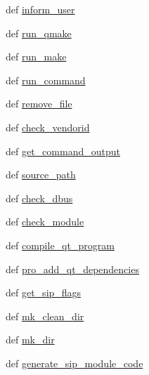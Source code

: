 \begin{DoxyCompactItemize}
def \hyperlink{namespacePyQt-x11-gpl-4_811_82_1_1configure-ng_aa0127c7e4d1567fa51c28bccf7345cb7}{inform\+\_\+user}
\item 
def \hyperlink{namespacePyQt-x11-gpl-4_811_82_1_1configure-ng_a5f1cb3fd0035af51cb0748b88d561f72}{run\+\_\+qmake}
\item 
def \hyperlink{namespacePyQt-x11-gpl-4_811_82_1_1configure-ng_a96462e6df602133502e315304d1ad04d}{run\+\_\+make}
\item 
def \hyperlink{namespacePyQt-x11-gpl-4_811_82_1_1configure-ng_a41ba68e1d71f5d0d6b843fb87acc5608}{run\+\_\+command}
\item 
def \hyperlink{namespacePyQt-x11-gpl-4_811_82_1_1configure-ng_acaa08649ca4fdb852f4586db307a1d2a}{remove\+\_\+file}
\item 
def \hyperlink{namespacePyQt-x11-gpl-4_811_82_1_1configure-ng_aa30aeb76be6f12c21ce35cbd134ab9ca}{check\+\_\+vendorid}
\item 
def \hyperlink{namespacePyQt-x11-gpl-4_811_82_1_1configure-ng_a86b2ff52bc434d58a64ef9ba96315336}{get\+\_\+command\+\_\+output}
\item 
def \hyperlink{namespacePyQt-x11-gpl-4_811_82_1_1configure-ng_ad5863a5574f3b33fcd407945bd2dd002}{source\+\_\+path}
\item 
def \hyperlink{namespacePyQt-x11-gpl-4_811_82_1_1configure-ng_ad294d0907136904f4b902cf7f2076b3e}{check\+\_\+dbus}
\item 
def \hyperlink{namespacePyQt-x11-gpl-4_811_82_1_1configure-ng_a3e5d929fd3a613633695502cdcf3f259}{check\+\_\+module}
\item 
def \hyperlink{namespacePyQt-x11-gpl-4_811_82_1_1configure-ng_a8554a4b65b9674e0307100ff0c673ea7}{compile\+\_\+qt\+\_\+program}
\item 
def \hyperlink{namespacePyQt-x11-gpl-4_811_82_1_1configure-ng_a464d12c4cb3bf7718d1b020d3ffb6cc9}{pro\+\_\+add\+\_\+qt\+\_\+dependencies}
\item 
def \hyperlink{namespacePyQt-x11-gpl-4_811_82_1_1configure-ng_a5ecca4523500b8b0bdf2e7f624d09335}{get\+\_\+sip\+\_\+flags}
\item 
def \hyperlink{namespacePyQt-x11-gpl-4_811_82_1_1configure-ng_a5108711a6c61e7621818670beebee79f}{mk\+\_\+clean\+\_\+dir}
\item 
def \hyperlink{namespacePyQt-x11-gpl-4_811_82_1_1configure-ng_a060bc254366d030528363b353636769f}{mk\+\_\+dir}
\item 
def \hyperlink{namespacePyQt-x11-gpl-4_811_82_1_1configure-ng_ac5a77a03ede8ec10fda10e92e7074a97}{generate\+\_\+sip\+\_\+module\+\_\+code}

\end{DoxyCompactItemize}
